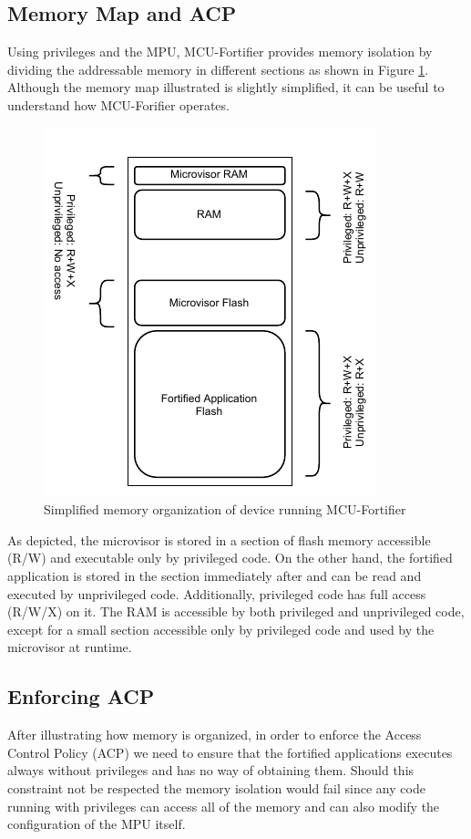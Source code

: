\documentclass{article}
\begin{document}
\subsection{Memory Map and ACP}
Using privileges and the MPU, MCU-Fortifier provides memory isolation by dividing the addressable memory in different sections as shown in Figure \ref{fig:design_mem_map}. Although the memory map illustrated is slightly simplified, it can be useful to understand how MCU-Forifier operates.
\begin{figure}
	\centering
	\includegraphics[scale=1]{images/design_mem_map.pdf}
	\caption{Simplified memory organization of device running MCU-Fortifier}
	\label{fig:design_mem_map}
\end{figure}

As depicted, the microvisor is stored in a section of flash memory accessible (R/W) and executable only by privileged code. On the other hand, the fortified application is stored in the section immediately after and can be read and executed by unprivileged code. Additionally, privileged code has full access (R/W/X) on it.
The RAM is accessible by both privileged and unprivileged code, except for a small section accessible only by privileged code and used by the microvisor at runtime.

\subsection{Enforcing ACP}
After illustrating how memory is organized, in order to enforce the Access Control Policy (ACP) we need to ensure that the fortified applications executes always without privileges and has no way of obtaining them. Should this constraint not be respected the memory isolation would fail since any code running with privileges can access all of the memory and can also modify the configuration of the MPU itself.
\end{document}

